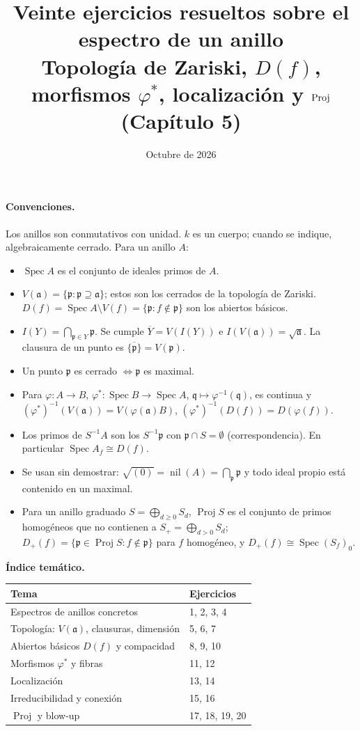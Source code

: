 \documentclass[11pt,a4paper]{article}
\title{\textbf{Veinte ejercicios resueltos sobre el espectro de un anillo}\\[4pt]
\large Topología de Zariski, $D(f)$, morfismos $\varphi^*$, localización y $\Proj$ (Capítulo 5)}
\author{}
\date{Octubre de 2026}
\newcommand{\Spec}{\operatorname{Spec}}
\newcommand{\Proj}{\operatorname{Proj}}
\newcommand{\nil}{\operatorname{nil}}
\newcommand{\p}{\mathfrak{p}}
\newcommand{\q}{\mathfrak{q}}
\begin{document}
\maketitle

\paragraph{Convenciones.} Los anillos son conmutativos con unidad. $k$ es un cuerpo; cuando se indique, algebraicamente cerrado. Para un anillo $A$:
\begin{itemize}[itemsep=1pt]
\item $\Spec A$ es el conjunto de ideales primos de $A$.
\item $V(\mathfrak a)=\{\p:\p\supseteq\mathfrak a\}$; estos son los cerrados de la topología de Zariski. $D(f)=\Spec A\setminus V(f)=\{\p: f\notin\p\}$ son los abiertos básicos.
\item $I(Y)=\bigcap_{\p\in Y}\p$. Se cumple $\overline Y=V(I(Y))$ e $I(V(\mathfrak a))=\sqrt{\mathfrak a}$. La clausura de un punto es $\overline{\{\p\}}=V(\p)$.
\item Un punto $\p$ es cerrado $\iff\p$ es maximal.
\item Para $\varphi:A\to B$, $\varphi^*:\Spec B\to\Spec A$, $\q\mapsto\varphi^{-1}(\q)$, es continua y $(\varphi^*)^{-1}(V(\mathfrak a))=V(\varphi(\mathfrak a)B)$, $(\varphi^*)^{-1}(D(f))=D(\varphi(f))$.
\item Los primos de $S^{-1}A$ son los $S^{-1}\p$ con $\p\cap S=\emptyset$ (correspondencia). En particular $\Spec A_f\cong D(f)$.
\item Se usan sin demostrar: $\sqrt{(0)}=\nil(A)=\bigcap_{\p}\p$ y todo ideal propio está contenido en un maximal.
\item Para un anillo graduado $S=\bigoplus_{d\ge0}S_d$, $\Proj S$ es el conjunto de primos homogéneos que no contienen a $S_+=\bigoplus_{d>0}S_d$; $D_+(f)=\{\p\in\Proj S: f\notin\p\}$ para $f$ homogéneo, y $D_+(f)\cong\Spec (S_f)_0$.
\end{itemize}

\bigskip
\noindent\textbf{Índice temático.}
\begin{center}
\begin{tabular}{@{}ll@{}}
\toprule
Tema & Ejercicios \\
\midrule
Espectros de anillos concretos & 1, 2, 3, 4 \\
Topología: $V(\mathfrak a)$, clausuras, dimensión & 5, 6, 7 \\
Abiertos básicos $D(f)$ y compacidad & 8, 9, 10 \\
Morfismos $\varphi^*$ y fibras & 11, 12 \\
Localización & 13, 14 \\
Irreducibilidad y conexión & 15, 16 \\
$\Proj$ y blow-up & 17, 18, 19, 20 \\
\bottomrule
\end{tabular}
\end{center}
\end{document}
